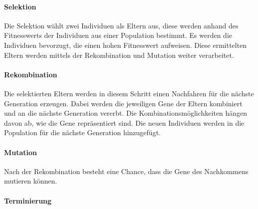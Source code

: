 \paragraph*{Selektion}
Die Selektion w{\"a}hlt zwei Individuen als Eltern aus, diese werden anhand des Fitnesswerts der Individuen aus einer Population bestimmt. 
Es werden die Individuen bevorzugt, die einen hohen Fitnesswert aufweisen. Diese ermittelten Eltern werden mittels der Rekombination und Mutation weiter verarbeitet.

\paragraph*{Rekombination}
Die selektierten Eltern werden in diesem Schritt einen Nachfahren f{\"u}r die n{\"a}chste Generation erzeugen. Dabei werden die jeweiligen Gene der Eltern kombiniert und an die n{\"a}chste Generation vererbt. Die Kombinationsm{\"o}glichkeiten h{\"a}ngen davon ab, wie die Gene repr{\"a}sentiert sind.
Die neuen Individuen werden in die Population f{\"u}r die n{\"a}chste Generation hinzugef{\"u}gt.


\paragraph*{Mutation}
Nach der Rekombination besteht eine Chance, dass die Gene des Nachkommens mutieren k{\"o}nnen. 

\paragraph*{Terminierung}

